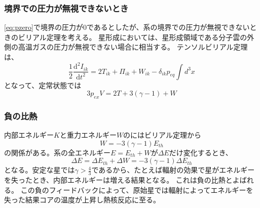 \documentclass{jsarticle}
\newcommand{\ddder}[2][]{\frac{\mathrm{d^2}#1}{\mathrm{d}#2^2}}
\newcommand{\half}{\frac{1}{2}}
\newcommand{\ethe}{E_{th}}
\newcommand{\beq}{\begin{equation}}
\newcommand{\eeq}{\end{equation}}
\begin{document}
\subsubsection{境界での圧力が無視できないとき}
\eqref{eq:pzero}で境界の圧力が0であるとしたが、系の境界での圧力が無視できないときのビリアル定理を考える。
星形成においては、星形成領域である分子雲の外側の高温ガスの圧力が無視できない場合に相当する。
テンソルビリアル定理は、
\beq
\half \ddder[I_{ik}]{t} = 2T_{ik} + \Pi_{ik} + W_{ik} - \delta_{ik} p_{eq} \int d^3 x
\eeq
となって、定常状態では
\beq
3p_{ex} V = 2T + 3(\gamma - 1) + W\label{eq:virialpressure}
\eeq
\subsubsection{負の比熱}
内部エネルギー$K$と重力エネルギー$W$のにはビリアル定理から
\beq
W = - 3(\gamma -1) \ethe
\eeq
の関係がある。系の全エネルギー$E = \ethe + W$が$\Delta E$だけ変化するとき、
\beq
    \Delta E = \Delta \ethe + \Delta W = -  3(\gamma -1)\Delta \ethe
\eeq
となる。安定な星では$\gamma > \frac{4}{3}$であるから、たとえば輻射の効果で星がエネルギーを失ったとき、内部エネルギーは増える結果となる。
これは負の比熱とよばれる。
この負のフィードバックによって、原始星では輻射によってエネルギーを失った結果コアの温度が上昇し熱核反応に至る。
\end{document}
